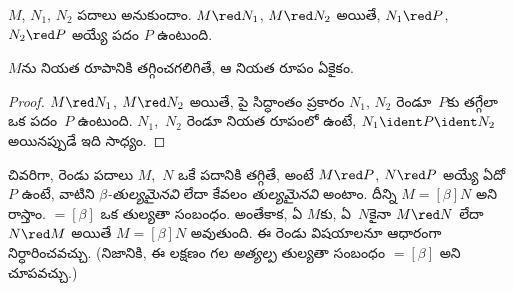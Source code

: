 \documentclass[../../../include/open-logic-section]{subfiles}
\begin{document}

\begin{thm}
$M$, $N_1$, $N_2$ పదాలు అనుకుందాం. $M \red N_1$, $M \red N_2$ అయితే,
$N_1 \red P$, $N_2 \red P$ అయ్యే పదం $P$ ఉంటుంది.
\end{thm}

\begin{cor}
$M$ను నియత రూపానికి తగ్గించగలిగితే, ఆ నియత రూపం ఏకైకం.
\end{cor}

\begin{proof}
$M \red N_1$, $M \red N_2$ అయితే, పై సిద్ధాంతం ప్రకారం $N_1$,
$N_2$ రెండూ~$P$కు తగ్గేలా ఒక పదం~$P$ ఉంటుంది. $N_1$,~$N_2$ రెండూ
నియత రూపంలో ఉంటే, $N_1 \ident P \ident N_2$ అయినప్పుడే ఇది సాధ్యం.
\end{proof}

చివరిగా, రెండు పదాలు $M$,~$N$ ఒకే పదానికి తగ్గితే, అంటే $M \red P$,
$N \red P$ అయ్యే ఏదో $P$ ఉంటే, వాటిని \emph{$\beta$-తుల్యమైనవి}
లేదా కేవలం \emph{తుల్యమైనవి} అంటాం. దీన్ని $M \equal[\beta] N$ అని
రాస్తాం. $\equal[\beta]$ ఒక తుల్యతా సంబంధం. అంతేకాక, ఏ $M$కు,
ఏ~$N$కైనా $M \red N$ లేదా $N \red M$ అయితే $M \equal[\beta] N$
అవుతుంది. ఈ రెండు విషయాలనూ  ఆధారంగా నిర్ధారించవచ్చు. (నిజానికి,
ఈ లక్షణం గల \emph{అత్యల్ప} తుల్యతా సంబంధం $\equal[\beta]$ అని
చూపవచ్చు.)
\end{document}

